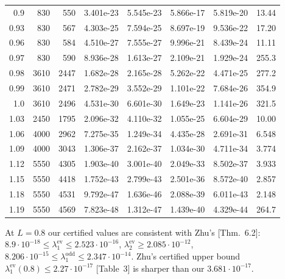 \documentclass[11pt]{amsart}
\newcommand{\ev}{\mathrm{ev}}
\newcommand{\od}{\mathrm{odd}}
\newcommand{\e}[1]{\cdot 10^{#1}}
\theoremstyle{definition}
\theoremstyle{remark}
\numberwithin{equation}{section}
\begin{document}
\begin{table}[ht]
\begin{tabular}{rrrllllr}
0.9 & 830 & 550 & 3.401e-23 & 5.545e-23 & 5.866e-17 & 5.819e-20 & 13.44\\
0.93 & 830 & 567 & 4.303e-25 & 7.594e-25 & 8.697e-19 & 9.536e-22 & 17.20\\
0.96 & 830 & 584 & 4.510e-27 & 7.555e-27 & 9.996e-21 & 8.439e-24 & 11.11\\
0.97 & 830 & 590 & 8.936e-28 & 1.613e-27 & 2.109e-21 & 1.929e-24 & 255.3\\
0.98 & 3610 & 2447 & 1.682e-28 & 2.165e-28 & 5.262e-22 & 4.471e-25 & 277.2\\
0.99 & 3610 & 2471 & 2.782e-29 & 3.552e-29 & 1.101e-22 & 7.684e-26 & 354.9\\
1.0 & 3610 & 2496 & 4.531e-30 & 6.601e-30 & 1.649e-23 & 1.141e-26 & 321.5\\
1.03 & 2450 & 1795 & 2.096e-32 & 4.110e-32 & 1.055e-25 & 6.604e-29 & 10.00\\
1.06 & 4000 & 2962 & 7.275e-35 & 1.249e-34 & 4.435e-28 & 2.691e-31 & 6.548\\
1.09 & 4000 & 3043 & 1.306e-37 & 2.162e-37 & 1.034e-30 & 4.711e-34 & 3.774\\
1.12 & 5550 & 4305 & 1.903e-40 & 3.001e-40 & 2.049e-33 & 8.502e-37 & 3.933\\
1.15 & 5550 & 4418 & 1.752e-43 & 2.799e-43 & 2.501e-36 & 8.572e-40 & 2.857\\
1.18 & 5550 & 4531 & 9.792e-47 & 1.636e-46 & 2.088e-39 & 6.011e-43 & 2.148\\
1.19 & 5550 & 4569 & 7.823e-48 & 1.312e-47 & 1.439e-40 & 4.329e-44 & 264.7\\
\bottomrule
\end{tabular}
\end{table}

At $L=0.8$ our certified values are consistent with Zhu's [Thm.~6.2]: $8.9\e{-18}\le\lambda_1^\ev\le2.523\e{-16}$, $\lambda_2^\ev\ge2.085\e{-12}$, $8.206\e{-15}\le\lambda_1^\od\le2.347\e{-14}$. Zhu's certified upper bound $\lambda_1^\ev(0.8)\le2.27\e{-17}$ [Table~3] is sharper than our $3.681\e{-17}$.
\end{document}
